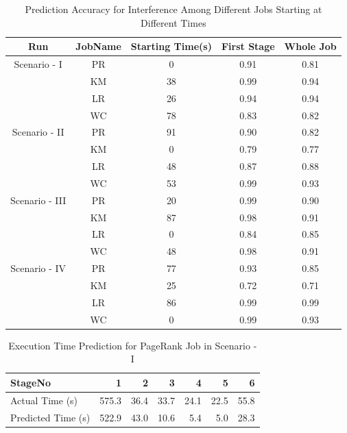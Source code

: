 
\begin{table}[!t]
\renewcommand{\arraystretch}{1.3}
\caption {Prediction Accuracy for Interference Among Different Jobs Starting at Different Times}
\label{table_differentjob_differentstarttime}
\centering
\begin{tabular}{c|c|c|c|c}
\hline

\bfseries Run & \bfseries JobName & \bfseries Starting Time(s) & \bfseries First Stage & \bfseries Whole Job\\
\hline\hline
Scenario - I & PR & 0 & 0.91 & 0.81\\
& KM & 38 & 0.99 & 0.94\\
& LR & 26 & 0.94 & 0.94 \\
& WC & 78 & 0.83 & 0.82\\
\hline
Scenario - II & PR & 91 & 0.90 & 0.82\\
& KM & 0 & 0.79 & 0.77\\
& LR & 48 & 0.87 & 0.88\\
& WC & 53 & 0.99 & 0.93\\
\hline
Scenario - III & PR & 20 & 0.99 & 0.90\\
& KM & 87 & 0.98 & 0.91\\
& LR & 0 & 0.84 & 0.85\\
& WC & 48 & 0.98 & 0.91\\
\hline
Scenario - IV & PR & 77 & 0.93 & 0.85\\
& KM & 25 & 0.72 & 0.71\\
& LR & 86 & 0.99 & 0.99 \\
& WC & 0 & 0.99 & 0.93\\
\hline
\end{tabular}
\end{table} 




\begin{table}[!htb]
\renewcommand{\arraystretch}{1.3}
\caption{Execution Time Prediction for PageRank Job in Scenario - I}
\label{bpr}
\centering
\begin{tabular}{l|r|r|r|r|r|r}
\hline
\bfseries StageNo & \bfseries 1 & \bfseries 2 & \bfseries 3 & \bfseries 4 & \bfseries 5 & \bfseries 6 \\
\hline \hline
Actual Time (s)
&575.3
&36.4
&33.7
&24.1
&22.5
&55.8 \\
\hline
Predicted Time (s) 
&522.9
&43.0
&10.6
&5.4
&5.0
&28.3 \\
\hline
\end{tabular}
\end{table}

